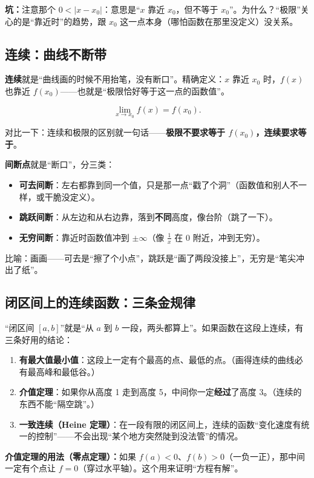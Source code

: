 ﻿\documentclass[11pt,a4paper,UTF8]{ctexart}
\newcommand{\warn}[1]{\par\smallskip\noindent\textcolor{red!70!black}{\textbf{坑：}#1}\par\smallskip}
\begin{document}
\warn{注意那个 $0<|x-x_0|$：意思是“$x$ 靠近 $x_0$，但不等于 $x_0$”。为什么？“极限”关心的是“靠近时”的趋势，跟 $x_0$ 这一点本身（哪怕函数在那里没定义）没关系。}

\subsection{连续：曲线不断带}

\textbf{连续}就是“曲线画的时候不用抬笔，没有断口”。精确定义：$x$ 靠近 $x_0$ 时，$f(x)$ 也靠近 $f(x_0)$——也就是“极限恰好等于这一点的函数值”。

$$\lim_{x\to x_0}f(x)=f(x_0).$$

对比一下：连续和极限的区别就一句话——\textbf{极限不要求等于 $f(x_0)$，连续要求等于}。

\textbf{间断点}就是“断口”，分三类：
\begin{itemize}[leftmargin=1.4em]
\item \textbf{可去间断}：左右都靠到同一个值，只是那一点“戳了个洞”（函数值和别人不一样，或干脆没定义）。
\item \textbf{跳跃间断}：从左边和从右边靠，落到\textbf{不同}高度，像台阶（跳了一下）。
\item \textbf{无穷间断}：靠近时函数值冲到 $\pm\infty$（像 $\frac1x$ 在 0 附近，冲到无穷）。
\end{itemize}

比喻：画画——可去是“擦了个小点”，跳跃是“画了两段没接上”，无穷是“笔尖冲出了纸”。

\subsection{闭区间上的连续函数：三条金规律}

“闭区间 $[a,b]$”就是“从 $a$ 到 $b$ 一段，两头都算上”。如果函数在这段上连续，有三条好用的结论：

\begin{enumerate}[leftmargin=1.4em]
\item \textbf{有最大值最小值}：这段上一定有个最高的点、最低的点。（画得连续的曲线必有最高峰和最低谷。）
\item \textbf{介值定理}：如果你从高度 1 走到高度 5，中间你一定\textbf{经过}了高度 3。（连续的东西不能“隔空跳”。）
\item \textbf{一致连续（Heine 定理）}：在一段有限的闭区间上，连续的函数“变化速度有统一的控制”——不会出现“某个地方突然陡到没法管”的情况。
\end{enumerate}

\textbf{介值定理的用法（零点定理）：}如果 $f(a)<0$、$f(b)>0$（一负一正），那中间一定有个点让 $f=0$（穿过水平轴）。这个用来证明“方程有解”。
\end{document}
